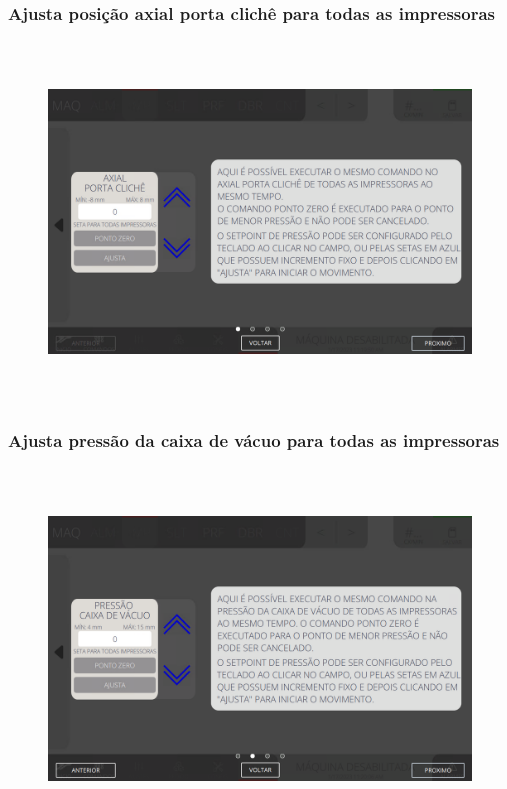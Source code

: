 \newpage
\thispagestyle{fancy}
\vspace*{\fill}
\subsubsection{\small{Ajusta posição axial porta clichê para todas as impressoras}}
\begin{figure}[h]
  \centering
  \includegraphics[width=576px,height=360px]{src/imagesFlexo/04-printter/01-printters/settings/e-9.png}
\end{figure}
\vspace*{\fill}

\newpage
\thispagestyle{fancy}
\vspace*{\fill}
\subsubsection{\small{Ajusta pressão da caixa de vácuo para todas as impressoras}}
\begin{figure}[h]
  \centering
  \includegraphics[width=576px,height=360px]{src/imagesFlexo/04-printter/01-printters/settings/e-10.png}
\end{figure}
\vspace*{\fill}

